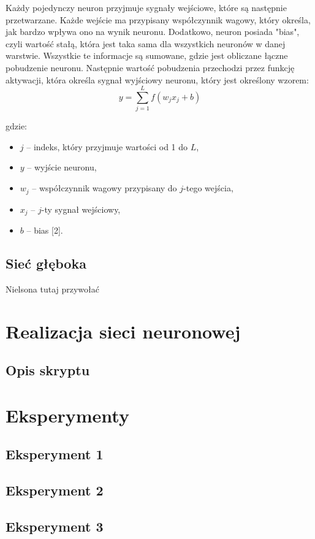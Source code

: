 \documentclass{article}
\begin{document}
Każdy pojedynczy neuron przyjmuje sygnały wejściowe, które są następnie przetwarzane.
Każde wejście ma przypisany współczynnik wagowy, który określa, jak bardzo wpływa ono na wynik neuronu.
Dodatkowo, neuron posiada "bias", czyli wartość stałą, która jest taka sama dla wszystkich neuronów w danej warstwie.
Wszystkie te informacje są sumowane, gdzie jest obliczane łączne pobudzenie neuronu.
Następnie wartość pobudzenia przechodzi przez funkcję aktywacji, która określa sygnał wyjściowy neuronu, który jest określony wzorem:
\[
    y = \sum_{j=1}^{L} f(w_{j} x_{j} + b)
\]

gdzie:
\begin{itemize}
    \item $j$ -- indeks, który przyjmuje wartości od 1 do $L$,
    \item $y$ -- wyjście neuronu,
    \item $w_{j}$ -- współczynnik wagowy przypisany do $j$-tego wejścia,
    \item $x_{j}$ -- $j$-ty sygnał wejściowy,
    \item $b$ -- bias [2].
\end{itemize}

\subsection{Sieć głęboka}
Nielsona tutaj przywołać
\section{Realizacja sieci neuronowej}
\subsection{Opis skryptu}
\section{Eksperymenty}
\subsection{Eksperyment 1}
\subsection{Eksperyment 2}
\subsection{Eksperyment 3}
\end{document}
